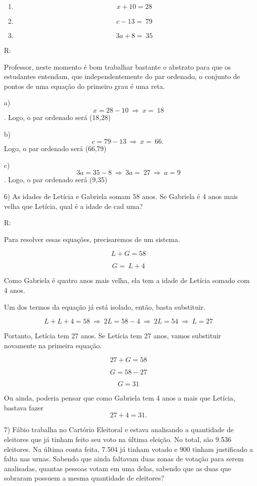 \begin{enumerate}
\def\labelenumi{\alph{enumi})}
\item
  \[x + 10 = 28\]
\item
  \[c - 13 = \ 79\]
\item
  \[3a + 8 = \ 35\]
\end{enumerate}

R:

Professor, neste momento é bom trabalhar bastante o abstrato para que os
estudantes entendam, que independentemente do par ordenado, o conjunto
de pontos de uma equação do primeiro grau é uma reta.

a) \[x = 28 - 10\  \Rightarrow \ x = \ 18\]. Logo, o par ordenado será
(18,28)

b) \[c = 79 - 13\  \Rightarrow \ x = \ 66.\ \] Logo, o par ordenado será
(66,79)

c) \[3a = 35 - 8\  \Rightarrow \ 3a = \ 27\  \Rightarrow \ a = 9\].
Logo, o par ordenado será (9,35)

6) As idades de Letícia e Gabriela somam 58 anos. Se Gabriela é 4 anos
mais velha que Letícia, qual é a idade de cad uma?

R:

Para resolver essas equações, precisaremos de um sistema.

\[L + G = 58\]

\[G = \ L + 4\]

Como Gabriela é quatro anos mais velha, ela tem a idade de Letícia
somado com 4 anos.

Um dos termos da equação já está isolado, então, basta substituir.

\[L + L + 4 = 58\  \Rightarrow \ 2L = 58 - 4\  \Rightarrow \ 2L = 54\  \Rightarrow \ L = 27\]

Portanto, Letícia tem 27 anos. Se Letícia tem 27 anos, vamos substituir
novamente na primeira equação.

\[27 + G = 58\]

\[G = 58 - 27\]

\[G = 31\]

Ou ainda, poderia pensar que como Gabriela tem 4 anos a mais que
Letícia, bastava fazer \[27 + 4 = 31.\]

7) Fábio trabalha no Cartório Eleitoral e estava analisando a quantidade
de eleitores que já tinham feito seu voto na última eleição. No total,
são 9.536 eleitores. Na última conta feita, 7.504 já tinham votado e 900
tinham justificado a falta nas urnas. Sabendo que ainda faltavam duas
zonas de votação para serem analisadas, quantas pessoas votam em uma
delas, sabendo que as duas que sobraram possuem a mesma quantidade de
eleitores?

